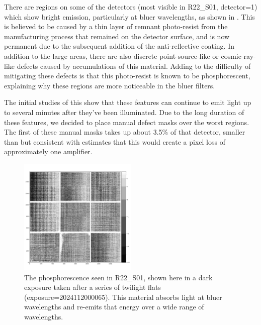 There are regions on some of the detectors (most visible in R22\_S01, detector=1) which show bright emission, particularly at bluer wavelengths, as shown in .
This is believed to be caused by a thin layer of remnant photo-resist from the manufacturing process that remained on the detector surface, and is now permanent due to the subsequent addition of the anti-reflective coating.
In addition to the large areas, there are also discrete point-source-like or cosmic-ray-like defects caused by accumulations of this material.
Adding to the difficulty of mitigating these defects is that this photo-resist is known to be phosphorescent, explaining why these regions are more noticeable in the bluer filters.

The initial studies of this show that these features can continue to emit light up to several minutes after they've been illuminated.
Due to the long duration of these features, we decided to place manual defect masks over the worst regions.
The first of these manual masks takes up about 3.5\% of that detector, smaller than but consistent with estimates that this would create a pixel loss of approximately one amplifier.

\begin{figure}
  \begin{center}
  \includegraphics[width=0.5\textwidth]{figures/isr-f01-phosphor_dark_exposure.jpg}
  \caption{The phosphorescence seen in R22\_S01, shown here in a dark exposure taken after a series of twilight flats (exposure=2024112000065).  This material absorbs light at bluer wavelengths and re-emits that energy over a wide range of wavelengths.}
  \label{fig:isr_phosphorescence_example}
  \end{center}
\end{figure}


